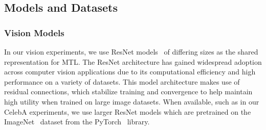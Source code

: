 
\subsection{Models and Datasets}


\subsubsection{Vision Models} In our vision experiments, we use ResNet models~\cite{ResNet} of differing sizes as the shared representation for MTL. The ResNet architecture has gained widespread adoption across computer vision applications due to its computational efficiency and high performance on a variety of datasets. This model architecture makes use of residual connections, which stabilize training and convergence to help maintain high utility when trained on large image datasets. When available, such as in our CelebA experiments, we use larger ResNet models which are pretrained on the ImageNet~\cite{imagenet} dataset from the PyTorch~\cite{paszke2019pytorch} library.


